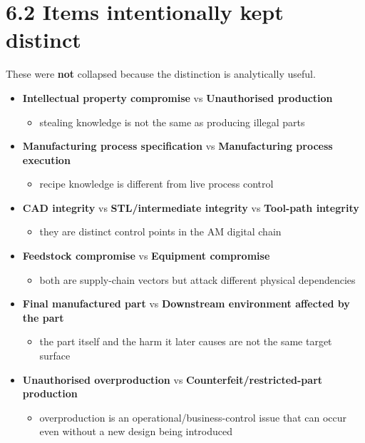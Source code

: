 \documentclass[10pt,a4paper,oneside]{report}
\begin{document}
\section{6.2 Items intentionally kept distinct}


These were \textbf{not} collapsed because the distinction is analytically useful.

\begin{itemize}
\item \textbf{Intellectual property compromise} vs \textbf{Unauthorised production}
\begin{itemize}
\item stealing knowledge is not the same as producing illegal parts
\end{itemize}
\item \textbf{Manufacturing process specification} vs \textbf{Manufacturing process execution}
\begin{itemize}
\item recipe knowledge is different from live process control
\end{itemize}
\item \textbf{CAD integrity} vs \textbf{STL/intermediate integrity} vs \textbf{Tool-path integrity}
\begin{itemize}
\item they are distinct control points in the AM digital chain
\end{itemize}
\item \textbf{Feedstock compromise} vs \textbf{Equipment compromise}
\begin{itemize}
\item both are supply-chain vectors but attack different physical dependencies
\end{itemize}
\item \textbf{Final manufactured part} vs \textbf{Downstream environment affected by the part}
\begin{itemize}
\item the part itself and the harm it later causes are not the same target surface
\end{itemize}
\item \textbf{Unauthorised overproduction} vs \textbf{Counterfeit/restricted-part production}
\begin{itemize}
\item overproduction is an operational/business-control issue that can occur even without a new design being introduced
\end{itemize}
\end{itemize}
\end{document}
